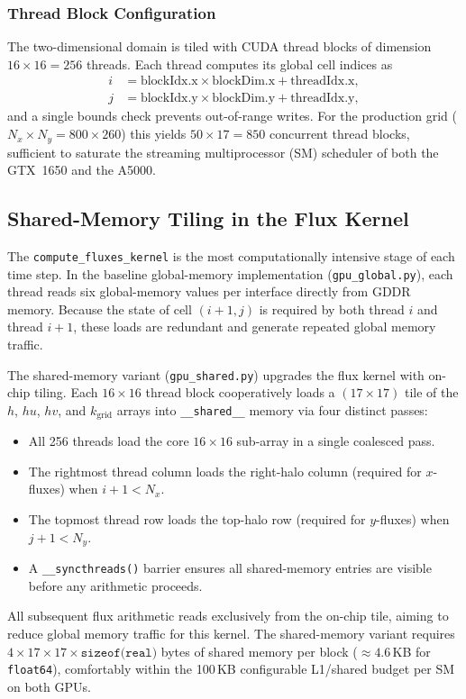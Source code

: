 \documentclass[10pt, conference]{FMFP2023}
\begin{document}
\subsubsection{Thread Block Configuration}

The two-dimensional domain is tiled with CUDA thread blocks
of dimension $16\times16=256$ threads.
Each thread computes its global cell indices as
\begin{align}
    i &= \text{blockIdx.x}\times\text{blockDim.x}
         + \text{threadIdx.x},
    \label{eq:thread_i} \\
    j &= \text{blockIdx.y}\times\text{blockDim.y}
         + \text{threadIdx.y},
    \label{eq:thread_j}
\end{align}
and a single bounds check prevents out-of-range writes.
For the production grid ($N_x\times N_y=800\times260$) this
yields $50\times17=850$ concurrent thread blocks, sufficient
to saturate the streaming multiprocessor (SM) scheduler of
both the GTX~1650 and the A5000.

\subsection{Shared-Memory Tiling in the Flux Kernel}

The \texttt{compute\_fluxes\_kernel} is the most
computationally intensive stage of each time step.
In the baseline global-memory implementation
(\texttt{gpu\_global.py}), each thread reads six
global-memory values per interface directly from GDDR
memory.
Because the state of cell $(i+1,j)$ is required by both
thread $i$ and thread $i+1$, these loads are redundant
and generate repeated global memory traffic.

The shared-memory variant
(\texttt{gpu\_shared.py}) upgrades the flux kernel with
on-chip tiling.
Each $16\times16$ thread block cooperatively loads a
$(17\times17)$ tile of the $h$, $hu$, $hv$, and
$k_{\text{grid}}$ arrays into \texttt{\_\_shared\_\_}
memory via four distinct passes:
\begin{itemize}[nosep]
    \item All 256 threads load the core $16\times16$
          sub-array in a single coalesced pass.
    \item The rightmost thread column loads the right-halo
          column (required for $x$-fluxes) when
          $i+1<N_x$.
    \item The topmost thread row loads the top-halo row
          (required for $y$-fluxes) when $j+1<N_y$.
    \item A \texttt{\_\_syncthreads()} barrier ensures all
          shared-memory entries are visible before any
          arithmetic proceeds.
\end{itemize}
All subsequent flux arithmetic reads exclusively from the
on-chip tile, aiming to reduce global memory traffic for
this kernel.
The shared-memory variant requires
$4\times17\times17\times\texttt{sizeof(real)}$
bytes of shared memory per block ($\approx4.6$\,KB for
\texttt{float64}), comfortably within the 100\,KB
configurable L1/shared budget per SM on both GPUs.
\end{document}
